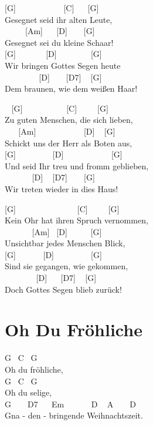 \documentclass[
  letterpaper,
  twoside=false]{scrbook}
\begin{document}
{[}G{]} ~ ~ ~ ~ ~ ~ ~{[}C{]} ~ ~{[}G{]}\\
Gesegnet seid ihr alten Leute,\\
\hspace*{0.333em} ~ ~ ~ {[}Am{]} ~ ~{[}D{]} ~ ~ {[}G{]}\\
Gesegnet sei du kleine Schaar!\\
{[}G{]} ~ ~ ~ ~ {[}D{]} ~ ~ ~ ~ ~{[}G{]}\\
Wir bringen Gottes Segen heute\\
\hspace*{0.333em} ~ ~ ~ ~ ~ {[}D{]} ~ ~ {[}D7{]} ~ {[}G{]}\\
Dem braunen, wie dem weißen Haar!

~ {[}G{]} ~ ~ ~ ~ ~ ~ {[}C{]} ~ ~ ~{[}G{]}\\
Zu guten Menschen, die sich lieben,\\
\hspace*{0.333em} ~ ~ {[}Am{]} ~ ~ ~ ~ ~ ~ ~{[}D{]} ~ {[}G{]}\\
Schickt uns der Herr als Boten aus,\\
{[}G{]} ~ ~ ~ ~ ~ {[}D{]} ~ ~ ~ ~ ~ ~ ~{[}G{]}\\
Und seid Ihr treu und fromm geblieben,\\
\hspace*{0.333em} ~ ~ ~ ~ {[}D{]} ~ {[}D7{]} ~ ~ {[}G{]}\\
Wir treten wieder in dies Haus!

{[}G{]} ~ ~ ~ ~ ~ ~ ~ ~ ~{[}C{]} ~ ~ ~{[}G{]}\\
Kein Ohr hat ihren Spruch vernommen,\\
\hspace*{0.333em} ~ ~ ~ ~ {[}Am{]} ~{[}D{]} ~ ~ ~ {[}G{]}\\
Unsichtbar jedes Menschen Blick,\\
{[}G{]} ~ ~ ~ ~{[}D{]} ~ ~ ~ ~ ~ {[}G{]}\\
Sind sie gegangen, wie gekommen,\\
\hspace*{0.333em} ~ ~ ~ ~ ~{[}D{]} ~ ~{[}D7{]} ~ {[}G{]}\\
Doch Gottes Segen blieb zurück!

\hypertarget{oh-du-fruxf6hliche}{%
\chapter{Oh Du Fröhliche}\label{oh-du-fruxf6hliche}}

G ~C ~G\\
Oh du fröhliche,\\
G ~C ~G\\
Oh du selige,\\
G ~ ~ D7 ~ ~Em ~ ~ ~ ~D ~ A ~ ~ D\\
Gna - den - bringende Weihnachtszeit.
\end{document}
